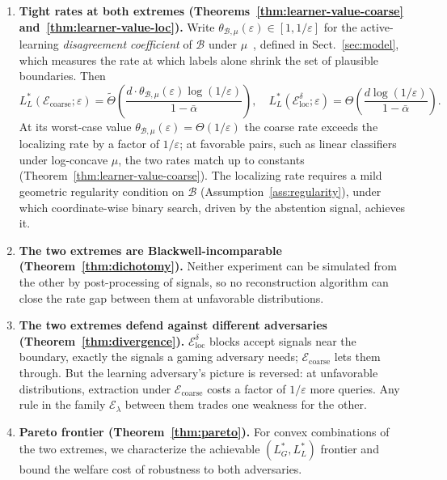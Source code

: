 \documentclass[runningheads,envcountsame]{llncs}
\newcommand{\cB}{\mathcal{B}}
\newcommand{\cE}{\mathcal{E}}
\newcommand{\eps}{\varepsilon}
\newcommand{\dis}{\theta}
\begin{document}
\begin{enumerate}[leftmargin=*]
\item \textbf{Tight rates at both extremes (Theorems~\ref{thm:learner-value-coarse} and~\ref{thm:learner-value-loc}).}
Write $\dis_{\cB, \mu}(\eps) \in [1, 1/\eps]$ for the active-learning \emph{disagreement coefficient} of $\cB$ under $\mu$~\cite{hanneke2014theory}, defined in Sect.~\ref{sec:model}, which measures the rate at which labels alone shrink the set of plausible boundaries. Then
\[
L^*_L(\cE_{\mathrm{coarse}}; \eps) = \tilde\Theta\!\left( \frac{d \cdot \dis_{\cB, \mu}(\eps) \log(1/\eps)}{1 - \bar\alpha} \right),
\quad
L^*_L(\cE_{\mathrm{loc}}^\delta; \eps) = \Theta\!\left( \frac{d \log(1/\eps)}{1 - \bar\alpha} \right)\!.
\]
At its worst-case value $\dis_{\cB, \mu}(\eps) = \Theta(1/\eps)$ the coarse rate exceeds the localizing rate by a factor of $1/\eps$; at favorable pairs, such as linear classifiers under log-concave $\mu$, the two rates match up to constants (Theorem~\ref{thm:learner-value-coarse}). The localizing rate requires a mild geometric regularity condition on $\cB$ (Assumption~\ref{ass:regularity}), under which coordinate-wise binary search, driven by the abstention signal, achieves it.

\item \textbf{The two extremes are Blackwell-incomparable (Theorem~\ref{thm:dichotomy}).} Neither experiment can be simulated from the other by post-processing of signals, so no reconstruction algorithm can close the rate gap between them at unfavorable distributions.

\item \textbf{The two extremes defend against different adversaries (Theorem~\ref{thm:divergence}).} $\cE_{\mathrm{loc}}^\delta$ blocks accept signals near the boundary, exactly the signals a gaming adversary needs; $\cE_{\mathrm{coarse}}$ lets them through. But the learning adversary's picture is reversed: at unfavorable distributions, extraction under $\cE_{\mathrm{coarse}}$ costs a factor of $1/\eps$ more queries. Any rule in the family $\cE_\lambda$ between them trades one weakness for the other.

\item \textbf{Pareto frontier (Theorem~\ref{thm:pareto}).} For convex combinations of the two extremes, we characterize the achievable $(L^*_G, L^*_L)$ frontier and bound the welfare cost of robustness to both adversaries.

\end{enumerate}
\end{document}
